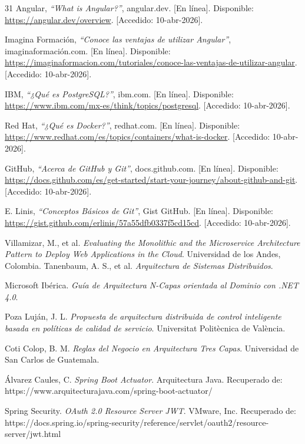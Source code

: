 \begin{thebibliography}{31}
Angular, \textit{``What is Angular?''}, angular.dev. [En línea]. Disponible: \url{https://angular.dev/overview}. [Accedido: 10-abr-2026].

Imagina Formación, \textit{``Conoce las ventajas de utilizar Angular''}, imaginaformación.com. [En línea]. Disponible: \url{https://imaginaformacion.com/tutoriales/conoce-las-ventajas-de-utilizar-angular}. [Accedido: 10-abr-2026].

IBM, \textit{``¿Qué es PostgreSQL?''}, ibm.com. [En línea]. Disponible: \url{https://www.ibm.com/mx-es/think/topics/postgresql}. [Accedido: 10-abr-2026].

Red Hat, \textit{``¿Qué es Docker?''}, redhat.com. [En línea]. Disponible: \url{https://www.redhat.com/es/topics/containers/what-is-docker}. [Accedido: 10-abr-2026].

GitHub, \textit{``Acerca de GitHub y Git''}, docs.github.com. [En línea]. Disponible: \url{https://docs.github.com/es/get-started/start-your-journey/about-github-and-git}. [Accedido: 10-abr-2026].

E. Linis, \textit{``Conceptos Básicos de Git''}, Gist GitHub. [En línea]. Disponible: \url{https://gist.github.com/erlinis/57a55dfb0337f5cd15cd}. [Accedido: 10-abr-2026].

Villamizar, M., et al. \textit{Evaluating the Monolithic and the Microservice Architecture Pattern to Deploy Web Applications in the Cloud}. Universidad de los Andes, Colombia.
Tanenbaum, A. S., et al. \textit{Arquitectura de Sistemas Distribuidos}.

Microsoft Ibérica. \textit{Guía de Arquitectura N-Capas orientada al Dominio con .NET 4.0}.

Poza Luján, J. L. \textit{Propuesta de arquitectura distribuida de control inteligente basada en políticas de calidad de servicio}. Universitat Politècnica de València.

Coti Colop, B. M. \textit{Reglas del Negocio en Arquitectura Tres Capas}. Universidad de San Carlos de Guatemala.

Álvarez Caules, C. \textit{Spring Boot Actuator}. Arquitectura Java. Recuperado de: https://www.arquitecturajava.com/spring-boot-actuator/

Spring Security. \textit{OAuth 2.0 Resource Server JWT}. VMware, Inc. Recuperado de: https://docs.spring.io/spring-security/reference/servlet/oauth2/resource-server/jwt.html


\end{thebibliography}
